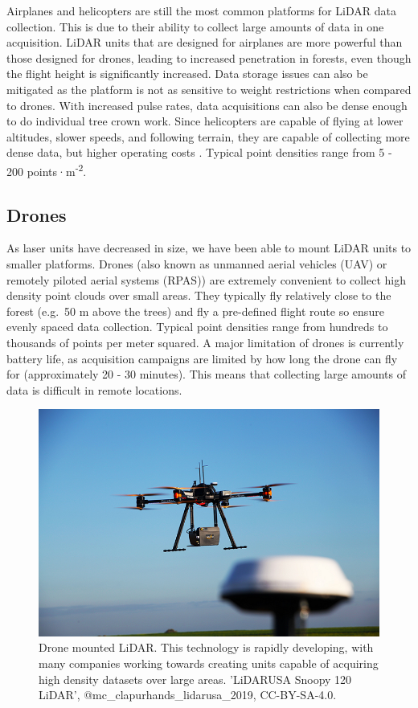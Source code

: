 \documentclass[
]{book}
\begin{document}
Airplanes and helicopters are still the most common platforms for LiDAR data collection. This is due to their ability to collect large amounts of data in one acquisition. LiDAR units that are designed for airplanes are more powerful than those designed for drones, leading to increased penetration in forests, even though the flight height is significantly increased. Data storage issues can also be mitigated as the platform is not as sensitive to weight restrictions when compared to drones. With increased pulse rates, data acquisitions can also be dense enough to do individual tree crown work. Since helicopters are capable of flying at lower altitudes, slower speeds, and following terrain, they are capable of collecting more dense data, but higher operating costs \citep{white_best_2013}. Typical point densities range from 5 - 200 points·m\textsuperscript{-2}.

\subsection{Drones}\label{drones}

As laser units have decreased in size, we have been able to mount LiDAR units to smaller platforms. Drones (also known as unmanned aerial vehicles (UAV) or remotely piloted aerial systems (RPAS)) are extremely convenient to collect high density point clouds over small areas. They typically fly relatively close to the forest (e.g.~50 m above the trees) and fly a pre-defined flight route so ensure evenly spaced data collection. Typical point densities range from hundreds to thousands of points per meter squared. A major limitation of drones is currently battery life, as acquisition campaigns are limited by how long the drone can fly for (approximately 20 - 30 minutes). This means that collecting large amounts of data is difficult in remote locations.

\begin{figure}
\includegraphics[width=0.7\linewidth]{images/15-LiDAR-on-Drone} \caption{Drone mounted LiDAR. This technology is rapidly developing, with many companies working towards creating units capable of acquiring high density datasets over large areas. 'LiDARUSA Snoopy 120 LiDAR', @mc_clapurhands_lidarusa_2019,  CC-BY-SA-4.0.}\label{fig:15-LiDAR-on-Drone}
\end{figure}
\end{document}
